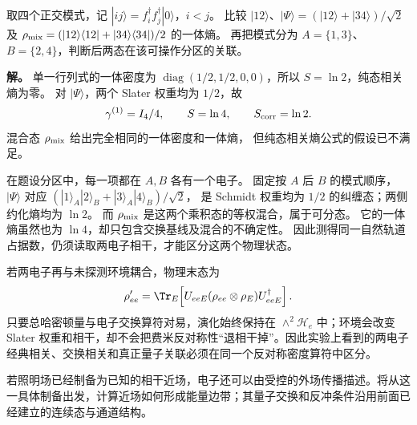 \begin{exbox}[相同一体密度不决定两电子的量子关联]
取四个正交模式，记 $|ij\rangle=f_i^\dagger f_j^\dagger|0\rangle$，$i<j$。
比较 $|12\rangle$、$|\Psi\rangle=(|12\rangle+|34\rangle)/\sqrt2$ 及
$\rho_{\rm mix}=(|12\rangle\langle12|+|34\rangle\langle34|)/2$ 的一体熵。
再把模式分为 $A=\{1,3\}$、$B=\{2,4\}$，判断后两态在该可操作分区的关联。

\textbf{解。} 单一行列式的一体密度为
$\operatorname{diag}(1/2,1/2,0,0)$，所以 $S=\ln2$，纯态相关熵为零。
对 $|\Psi\rangle$，两个 Slater 权重均为 $1/2$，故
\[
\gamma^{(1)}=I_4/4,\qquad S=\ln4,\qquad S_{\rm corr}=\ln2.
\]
混合态 $\rho_{\rm mix}$ 给出完全相同的一体密度和一体熵，
但纯态相关熵公式的假设已不满足。

在题设分区中，每一项都在 $A,B$ 各有一个电子。
固定按 $A$ 后 $B$ 的模式顺序，$|\Psi\rangle$ 对应
$(|1\rangle_A|2\rangle_B+|3\rangle_A|4\rangle_B)/\sqrt2$，
是 Schmidt 权重均为 $1/2$ 的纠缠态；两侧约化熵均为 $\ln2$。
而 $\rho_{\rm mix}$ 是这两个乘积态的等权混合，属于可分态。
它的一体熵虽然也为 $\ln4$，却只包含交换基线及混合的不确定性。
因此测得同一自然轨道占据数，仍须读取两电子相干，才能区分这两个物理状态。
\end{exbox}

若两电子再与未探测环境耦合，物理末态为
\[
\rho_{ee}'
=\Tr_E\!\left[
U_{eeE}(\rho_{ee}\otimes\rho_E)U_{eeE}^\dagger
\right].
\]
只要总哈密顿量与电子交换算符对易，演化始终保持在 $\wedge^2\mathcal H_e$ 中；环境会改变 Slater 权重和相干，却不会把费米反对称性“退相干掉”。因此实验上看到的两电子经典相关、交换相关和真正量子关联必须在同一个反对称密度算符中区分。

若照明场已经制备为已知的相干近场，电子还可以由受控的外场传播描述。将从这一具体制备出发，计算近场如何形成能量边带；其量子交换和反冲条件沿用前面已经建立的连续态与通道结构。
